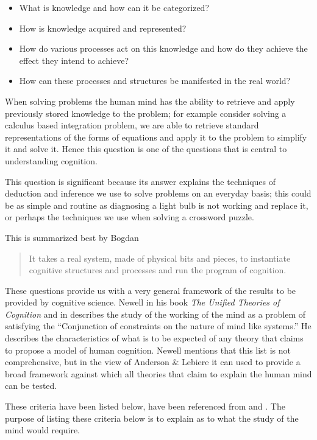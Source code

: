 \begin{itemize}
\item What is knowledge and how can it be categorized?
\item How is knowledge acquired and represented?
\item How do various processes act on this knowledge and how do they
achieve the effect they intend to achieve?
\item How can these processes and structures be manifested in the real
world?
\end{itemize}



 When solving problems the human mind has the ability to
retrieve and apply previously stored knowledge to the problem; for
example consider solving a calculus based integration problem, we are
able to retrieve standard representations of the forms of equations
and apply it to the problem to simplify it and solve it. Hence this
question is one of the questions that is central to understanding
cognition.

This question is significant because its answer explains the
techniques of deduction and inference we use to solve problems on an
everyday basis; this could be as simple and routine as diagnosing a
light bulb is not working and replace it, or perhaps the techniques we
use when solving a crossword puzzle. 

This is summarized best by Bogdan \cite{Bogdan:1993aa}

\begin{quote}
It takes a real system, made of physical bits and pieces, to 
instantiate cognitive structures and processes and run the program of 
cognition.
\end{quote}

These questions provide us with a very general framework of the
results to be provided by cognitive science. Newell in his book
\emph{The Unified Theories of Cognition} and in
\cite{Newell1980135} describes the study of the working of the mind as
a problem of satisfying the ``Conjunction of constraints on the nature
of mind like systems.'' He describes the characteristics of what is to
be expected of any theory that claims to propose a model of human
cognition. Newell mentions that this list is not comprehensive, but in
the view of Anderson \& Lebiere it can used to provide a broad
framework against which all theories that claim to explain the human
mind can be tested.
 

These criteria have been listed below, have been referenced from
\cite{CambridgeJournals:207162} and \cite{Newell:1990aa}. The purpose
of listing these criteria below is to explain as to what the study of
the mind would require.

